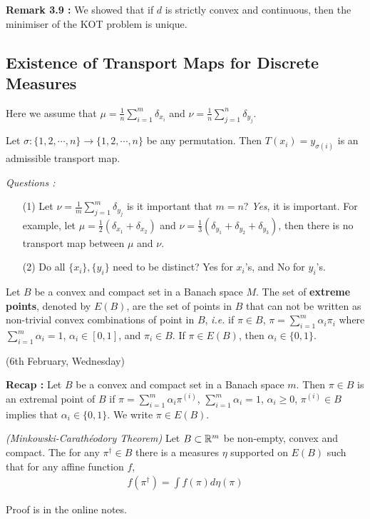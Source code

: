 \documentclass[12pt,a4paper]{article}
\newenvironment{proof}
{\begin{changemargin}{1cm}{0.5cm} 
	}%
	{\end{changemargin}
}
\newenvironment{p}
{\begin{proof} 
	}%
	{\end{proof}
}
\begin{document}
\textbf{Remark 3.9 :} We showed that if $d$ is strictly convex and continuous, then the minimiser of the KOT problem is unique.

\subsection{Existence of Transport Maps for Discrete Measures}

Here we assume that $\mu = \frac{1}{n} \sum_{i=1}^m \delta_{x_i}$ and $\nu = \frac{1}{n} \sum_{j=1}^n \delta_{y_j}$.
\s

Let $\sigma : \{1, 2, \cdots ,n \} \rightarrow \{1, 2, \cdots ,n \}$ be any permutation. Then $T(x_i) = y_{\sigma(i)}$ is an admissible transport map.
\s

\emph{Questions :}
\begin{itemize}
\item[(1)] Let $\nu =\frac{1}{m}\sum_{j=1}^m \delta_{y_j}$ is it important that $m=n$? \textit{Yes}, it is important. For example, let $\mu = \frac{1}{2}(\delta_{x_1} + \delta_{x_2})$ and $\nu = \frac{1}{3} (\delta_{y_1} + \delta_{y_2} + \delta_{y_3})$, then there is no transport map between $\mu$ and $\nu$. 
\item[(2)] Do all $\{x_i\},\{y_i\}$ need to be distinct? Yes for $x_i$'s, and No for $y_i$'s.
\end{itemize}
\s

 Let $B$ be a convex and compact set in a Banach space $M$. The set of \textbf{extreme points}, denoted by $E(B)$, are the set of points in $B$ that can not be written as non-trivial convex combinations of point in $B$, \textit{i.e.} if $\pi \in B$, $\pi = \sum_{i=1}^m \alpha_i \pi_i$ where $\sum_{i=1}^m \alpha_i =1$, $\alpha_i \in [0,1]$, and $\pi_i \in B$. If $\pi \in E(B)$, then $\alpha_i \in \{0,1\}$.
\s

\newday

(6th February, Wednesday)
\s

\textbf{Recap :} Let $B$ be a convex and compact set in a Banach space $m$. Then $\pi \in B$ is an extremal point of $B$ if $\pi = \sum_{i=1}^m \alpha_i \pi^{(i)}$, $\sum_{i=1}^m \alpha_i =1$, $\alpha_i \geq 0 $, $\pi^{(i)}\in B$ implies that $\alpha_i \in \{0, 1\}$. We write $\pi \in E(B)$.
\s

 \emph{(Minkowski-Carath\'{e}odory Theorem)} Let $B\subset \mathbb{R}^m$ be non-empty, convex and compact. The for any $\pi^{\dagger} \in B$ there is a measures $\eta$ supported on $E(B)$ such that for any affine function $f$,
\begin{align*}
f(\pi^{\dagger}) = \int f(\pi) d\eta(\pi)
\end{align*}
\begin{p}
\pf Proof is in the online notes.
\end{p}
\s
\end{document}
